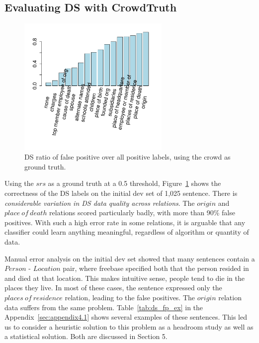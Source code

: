 \subsection{Evaluating DS with CrowdTruth}
\label{sec:ds-eval}

\begin{figure}[htb!]
\centering
\includegraphics[width=0.65\textwidth]{img/fp_ratio.pdf}
\caption{DS ratio of false positive over all positive labels, using the crowd as ground truth.}
\label{fig:fp_rate}
\end{figure}

Using the $srs$ as a ground truth at a 0.5 threshold, Figure~\ref{fig:fp_rate} shows the correctness of the DS labels on the initial dev set of 1,025 sentence. There is \textit{considerable variation in DS data quality across relations}. The $origin$ and $place\ of\ death$ relations scored particularly badly, with more than 90\% false positives. With such a high error rate in some relations, it is arguable that any classifier could learn anything meaningful, regardless of algorithm or quantity of data.

Manual error analysis on the initial dev set showed that many sentences contain a $Person$ - $Location$ pair, where freebase specified both that the person resided in and died at that location. This makes intuitive sense, people tend to die in the places they live.  In most of these cases, the sentence expressed only the $places\ of\ residence$ relation, leading to the false positives. The $origin$ relation data suffers from the same problem.  Table~\ref{tab:ds_fp_ex} in the Appendix~\ref{sec:appendix4.1} shows several examples of these sentences. This led us to consider a heuristic solution to this problem as a headroom study as well as a statistical solution. Both are discussed in Section 5.

